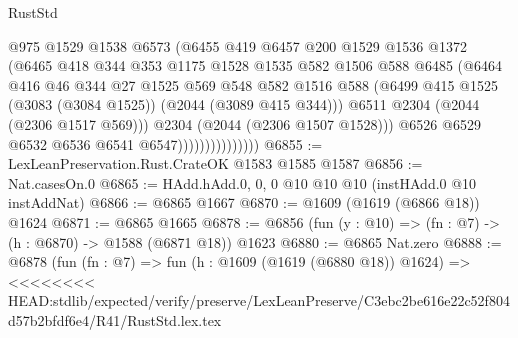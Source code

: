 \begin{lexlean}{RustStd}
\begin{coremodule}
{\begin{coremodule}
{{{{{{{{{{{{{{                                @975
                                @1529
                                @1538
                                @6573
                                (@6455
                                  @419
                                  @6457
                                  @200
                                  @1529
                                  @1536
                                  @1372
                                  (@6465
                                    @418
                                    @344
                                    @353
                                    @1175
                                    @1528
                                    @1535
                                    @582
                                    @1506
                                    @588
                                    @6485
                                    (@6464
                                      @416
                                      @46
                                      @344
                                      @27
                                      @1525
                                      @569
                                      @548
                                      @582
                                      @1516
                                      @588
                                      (@6499
                                        @415
                                        @1525
                                        (@3083 (@3084 @1525))
                                        (@2044 (@3089 @415 @344)))
                                      @6511
                                      @2304
                                      (@2044 (@2306 @1517 @569)))
                                    @2304
                                    (@2044 (@2306 @1507 @1528)))
                                  @6526
                                  @6529
                                  @6532
                                  @6536
                                  @6541
                                  @6547)))))))))))))))
@6855 := LexLeanPreservation.Rust.CrateOK @1583 @1585 @1587
@6856 := Nat.casesOn.{0}
@6865 := HAdd.hAdd.{0, 0, 0} @10 @10 @10 (instHAdd.{0} @10 instAddNat)
@6866 := @6865 @1667
@6870 := @1609 (@1619 (@6866 @18)) @1624
@6871 := @6865 @1665
@6878 := @6856 (fun (y : @10) => (fn : @7) -> (h : @6870) -> @1588 (@6871 @18)) @1623
@6880 := @6865 Nat.zero
@6888 := @6878
    (fun (fn : @7) =>
    fun (h : @1609 (@1619 (@6880 @18)) @1624) =>
<<<<<<<< HEAD:stdlib/expected/verify/preserve/LexLeanPreserve/C3ebc2be616e22c52f804d57b2bfdf6e4/R41/RustStd.lex.tex
}}}}}}}}}}}}}}
\end{coremodule}}
\end{coremodule}
\end{lexlean}
